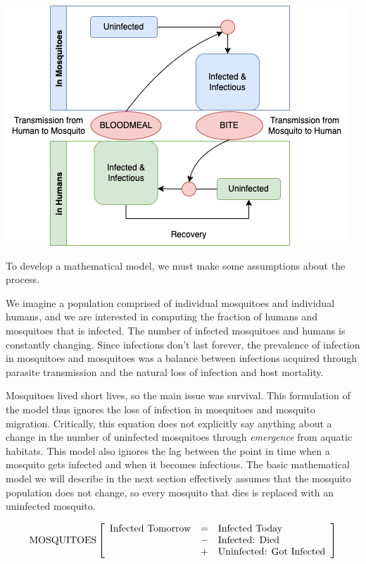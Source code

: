 \documentclass[
]{book}
\begin{document}
\includegraphics{Figures/LifeCycleModel.png}

To develop a mathematical model, we must make some assumptions about the process.

We imagine a population comprised of individual mosquitoes and individual humans, and we are interested in computing the fraction of humans and mosquitoes that is infected. The number of infected mosquitoes and humans is constantly changing. Since infections don't last forever, the prevalence of infection in mosquitoes and mosquitoes was a balance between infections acquired through parasite transmission and the natural loss of infection and host mortality.

Mosquitoes lived short lives, so the main issue was survival. This formulation of the model thus ignores the loss of infection in mosquitoes and mosquito migration. Critically, this equation does not explicitly say anything about a change in the number of uninfected mosquitoes through \emph{emergence} from aquatic habitats. This model also ignores the lag between the point in time when a mosquito gets infected and when it becomes infectious. The basic mathematical model we will describe in the next section effectively assumes that the mosquito population does not change, so every mosquito that dies is replaced with an uninfected mosquito.

\[
\mbox{MOSQUITOES} 
\\ \; \\
\left[
\begin{array}{rcl}
\mbox{Infected Tomorrow} &=& \mbox{Infected Today} \\
&-&\mbox{Infected: Died}\\
&+&\mbox{Uninfected: Got Infected}\\
\end{array} \right]
\]
\end{document}
